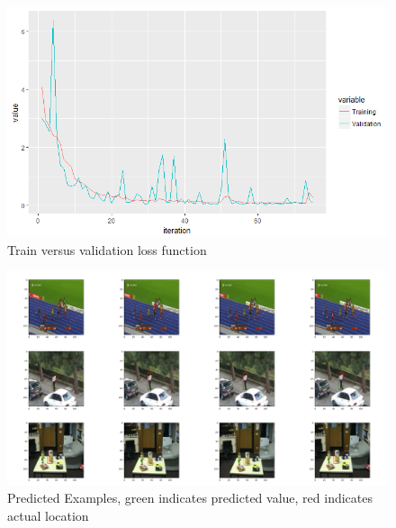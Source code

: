 \documentclass[sigconf]{acmart}
\begin{document}
 
\begin{figure}[htbp]
  \includegraphics[width=\linewidth]{images/Plot.png}
  \caption{Train versus validation loss function}
  \label{fig:Evaluation plot}
\end{figure}


\begin{figure}[htbp]
  \includegraphics[width=\linewidth]{images/Predicted.jpg}
  \caption{Predicted Examples, green indicates predicted value, red indicates actual location}
  \label{fig:Prediction Examples}
\end{figure}
\end{document}
